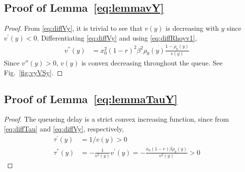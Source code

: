 \documentclass{IEEEtran}
\begin{document}
    \subsection*{Proof of Lemma~\ref{eq:lemmavY}}
    \vspace{3mm}
\begin{proof}
    From \eqref{eq:diffVy}, it is trivial to see that $v(y)$ is  decreasing with $y$ since  $v^{'}(y)<0$. Differentiating \eqref{eq:diffVy} and using \eqref{eq:diffRhoyv1},
    \begin{align}
        v^{''}(y)&=x_0^2(1-r)^2\beta^2 \rho_0(y)\frac{1-\rho_0(y)}{v(y)}
    \end{align}
    Since $v''(y)>0$, $v(y)$ is convex decreasing throughout the queue. See Fig.~\ref{fig:vyVSy}.
    \end{proof}

    \subsection*{Proof of Lemma~\ref{eq:lemmaTauY}}
    \vspace{3mm}
\begin{proof}
     The queueing delay is a strict convex increasing function, since from \eqref{eq:diffTau} and \eqref{eq:diffVy}, respectively,
      \begin{align}
          \tau^{'}(y) &= 1/v(y) > 0 \label{eq:diffTauv2} \\
          \tau^{''}(y) &= -\frac{1}{v^2(y)}v^{'}(y)=-\frac{x_0(1-r)\beta \rho_0(y)}{v^2(y)}>0 \label{eq:diffdiffTau}
      \end{align}
      \end{proof}
\end{document}
